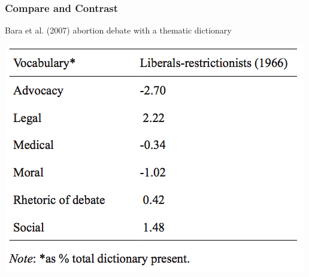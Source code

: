 \documentclass[11pt,compress,professionalfonts]{beamer}
\begin{document}
\begin{frame}[t,fragile]
%
%
%
%
%
%
%
%
%
%
%

\end{frame}
\begin{frame}[t,fragile]\frametitle{Compare and Contrast}

Bara et al. (2007) abortion debate with a thematic dictionary
\begin{center}
\includegraphics[scale=.4]{pictures/bara-diffs}
\end{center}

\end{frame}
\end{document}

